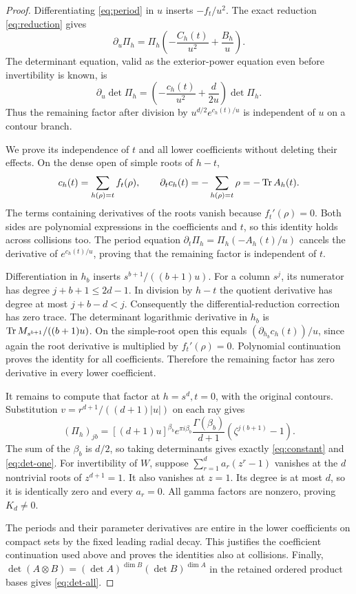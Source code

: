 \begin{proof}
Differentiating \eqref{eq:period} in $u$ inserts $-f_t/u^2$.
The exact reduction \eqref{eq:reduction} gives
\[
 \partial_u\Pi_h=\Pi_h\left(-\frac{C_h(t)}{u^2}
                                    +\frac{B_h}u\right).
\]
The determinant equation, valid as the exterior-power equation even
before invertibility is known, is
\begin{equation}
 \partial_u\det\Pi_h=
     \left(-\frac{c_h(t)}{u^2}+\frac d{2u}\right)\det\Pi_h.
 \label{eq:det-ode}
\end{equation}
Thus the remaining factor after division by $u^{d/2}e^{c_h(t)/u}$
is independent of $u$ on a contour branch.

We prove its independence of $t$ and all lower coefficients without
deleting their effects.  On the dense open of simple roots of $h-t$,
\[
 c_h(t)=\sum_{h(\rho)=t}f_t(\rho),\qquad
 \partial_t c_h(t)=-\sum_{h(\rho)=t}\rho=-\operatorname{Tr} A_h(t).
\]
The terms containing derivatives of the roots vanish because
$f_t'(\rho)=0$.  Both sides are polynomial expressions in the
coefficients and $t$, so this identity holds across collisions too.
The period equation
$\partial_t\Pi_h=\Pi_h(-A_h(t)/u)$ cancels the derivative of
$e^{c_h(t)/u}$, proving that the remaining factor is independent of $t$.

Differentiation in $h_b$ inserts $s^{b+1}/((b+1)u)$.  For a column
$s^j$, its numerator has degree $j+b+1\le2d-1$.
In division by $h-t$ the quotient derivative has degree at most
$j+b-d<j$.  Consequently the differential-reduction correction has
zero trace.  The determinant logarithmic derivative in $h_b$ is
$\operatorname{Tr} M_{s^{b+1}}/((b+1)u)$.  On the simple-root open this equals
$(\partial_{h_b}c_h(t))/u$, since again the root derivative is multiplied
by $f_t'(\rho)=0$.  Polynomial continuation proves the identity for all
coefficients.  Therefore the remaining factor has zero derivative in
every lower coefficient.

It remains to compute that factor at $h=s^d,t=0$, with the original
contours.  Substitution $v=r^{d+1}/((d+1)|u|)$ on each ray gives
\begin{equation}
 (\Pi_h)_{jb}
  =[(d+1)u]^{\beta_b}e^{\pi i\beta_b}
        \frac{\Gamma(\beta_b)}{d+1}
             (\zeta^{j(b+1)}-1).
 \label{eq:gamma-columns}
\end{equation}
The sum of the $\beta_b$ is $d/2$, so taking determinants gives
exactly \eqref{eq:constant} and \eqref{eq:det-one}.
For invertibility of $W$, suppose
$\sum_{r=1}^d a_r(z^r-1)$ vanishes at the $d$ nontrivial roots of
$z^{d+1}=1$.  It also vanishes at $z=1$.  Its degree is at most $d$,
so it is identically zero and every $a_r=0$.  All gamma factors are
nonzero, proving $K_d\ne0$.

The periods and their parameter derivatives are entire in the lower
coefficients on compact sets by the fixed leading radial decay.
This justifies the coefficient continuation used above and proves the
identities also at collisions.  Finally,
$\det(A\otimes B)=(\det A)^{\dim B}(\det B)^{\dim A}$ in the
retained ordered product bases gives \eqref{eq:det-all}.
\end{proof}

